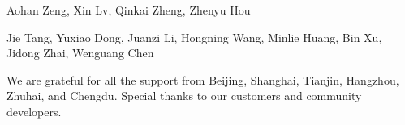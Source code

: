 \documentclass{article}
\theoremstyle{definition}
\begin{document}
Aohan Zeng, Xin Lv, Qinkai Zheng, Zhenyu Hou

Jie Tang, Yuxiao Dong, Juanzi Li, Hongning Wang, Minlie Huang, Bin Xu, Jidong Zhai, Wenguang Chen

We are grateful for all the support from Beijing, Shanghai, Tianjin, Hangzhou, Zhuhai, and Chengdu.
Special thanks to our customers and community developers.

\clearpage




\clearpage
\end{document}
